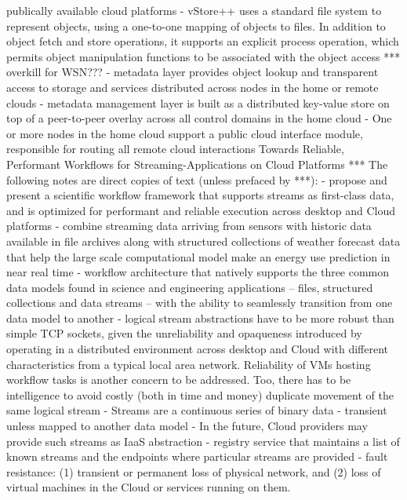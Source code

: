 publically available cloud platforms
					- vStore++ uses a standard file system to represent objects, using a one-to-one mapping
of objects to files. In addition to object fetch and store operations, it supports an explicit process operation, which
permits object manipulation functions to be associated with the object access								*** overkill for WSN???
					- metadata layer provides object lookup and transparent access to storage and services distributed across nodes in the home or remote clouds
					 - metadata management layer is built as a distributed key-value store on top of a peer-to-peer overlay across all control domains in the home cloud
					 - One or more nodes in the home cloud support a public cloud interface module, responsible for routing all remote cloud interactions
			Towards Reliable, Performant Workflows for Streaming-Applications on Cloud Platforms
			*** The following notes are direct copies of text (unless prefaced by ***):
				- propose and present a scientific workflow framework that supports streams as first-class data, and is optimized for performant and reliable execution across desktop and Cloud platforms
				- combine streaming data arriving from sensors with historic data available in file archives along with structured collections of weather forecast data that help the large scale computational model make an energy use prediction in near real time
				- workflow architecture that natively supports the three common data models found in science and engineering applications -- files, structured collections and data streams -- with the ability to seamlessly transition from one data model to another
				- logical stream abstractions have to be more robust than simple TCP sockets, given the unreliability and opaqueness introduced by operating in a distributed environment across desktop and Cloud with different characteristics from a typical local area network. Reliability of VMs hosting workflow tasks
is another concern to be addressed. Too, there has to be intelligence to avoid costly (both in time and money) duplicate movement of the same logical stream
				- Streams are a continuous series of binary data
				- transient unless mapped to another data model
				- In the future, Cloud providers may provide such streams as IaaS abstraction
				- registry service that maintains a list of known streams and the endpoints where particular
streams are provided
				- fault resistance: (1) transient or permanent loss of physical network, and (2) loss of virtual machines in the Cloud or services running on them.
				
